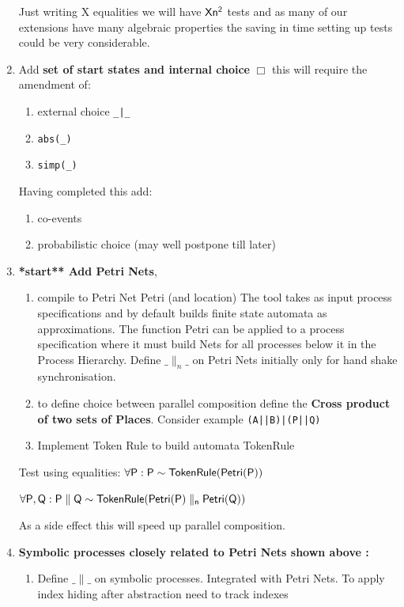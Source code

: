 \documentclass[]{article}
\begin{document}
\begin{enumerate}
Just writing {\sf X} equalities we will  have ${\sf Xn^2}$ tests  and as many of our extensions have many algebraic properties  the saving in time setting up tests could be very considerable.

\item Add {\bf set of start states and internal choice} $\Box$  this will require the amendment of:
\begin{enumerate}
\item  external choice \verb$_|_$
\item  \verb|abs(_)|
\item \verb|simp(_)|
\end{enumerate}
Having completed this add:
\begin{enumerate}
\item co-events
\item probabilistic choice (may well postpone till later)
\end{enumerate}

\item {\bf **start** Add   Petri Nets}, 
\begin{enumerate}
\item compile to Petri Net {\sf Petri} (and location)  The tool takes as input process specifications and by default builds finite state automata as approximations.   The function {\sf Petri} can be applied to a process specification where it must build Nets for all processes below it in the {\sf Process Hierarchy}.   Define $\_\parallel_n\_$ on Petri Nets initially only for hand shake synchronisation.

\item to define choice between parallel composition define the {\bf Cross product of two sets of Places}. Consider example \verb$(A||B)|(P||Q)$

\item Implement Token Rule to build automata {\sf TokenRule} 
\end{enumerate}
Test using equalities: $\sf \forall {\sf P} : P  \sim  TokenRule(Petri(P))$ 

$\sf \forall {\sf P, Q} : P\parallel Q  \sim  TokenRule(Petri(P)\parallel_n Petri(Q))$

 As a side effect this will speed up parallel composition. 

\item {\bf Symbolic processes closely related to Petri Nets shown above :}
\begin{enumerate}
\item Define $\_\parallel\_$ on symbolic processes.  Integrated with Petri Nets. To  apply index hiding  after abstraction need to track indexes 


\end{enumerate}
\end{enumerate}
\end{document}
